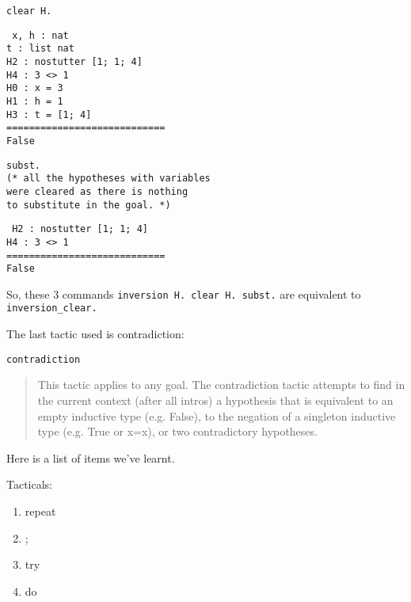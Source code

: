 \documentclass[12pt]{article}
\newcommand{\codeBlock}[1]{\colorbox{cverbbg}{\parbox{0.85\textwidth}{#1}}}
\begin{document}
\vspace{2em}
\begin{minipage}[t]{.45\textwidth}
\begin{verbatim}
clear H.
\end{verbatim}

\codeBlock{{\tt
x, h : nat\\
t : list nat\\
H2 : nostutter [1; 1; 4]\\
H4 : 3 <> 1\\
H0 : x = 3\\
H1 : h = 1\\
H3 : t = [1; 4]\\
============================\\
False
}}
\end{minipage}
\hfill
\begin{minipage}[t]{.45\textwidth}
\begin{verbatim}
subst.
(* all the hypotheses with variables
were cleared as there is nothing
to substitute in the goal. *)
\end{verbatim}

\codeBlock{{\tt
H2 : nostutter [1; 1; 4]\\
H4 : 3 <> 1\\
============================\\
False
}}
\end{minipage}

\vspace{2em}
So, these 3 commands \texttt{inversion H. clear H. subst.} are equivalent to {\tt inversion\_clear.}

The last tactic used is contradiction:

\begin{verbatim}
contradiction
\end{verbatim}

\begin{quote}
This tactic applies to any goal. The contradiction tactic attempts to find in the current context (after all intros) a hypothesis that is equivalent to an empty inductive type (e.g. False), to the negation of a singleton inductive type (e.g. True or x=x), or two contradictory hypotheses.
\end{quote}

Here is a list of items we've learnt.

\noindent
Tacticals:

\begin{enumerate}
\item repeat
\item ;
\item try
\item do
\end{enumerate}
\end{document}
